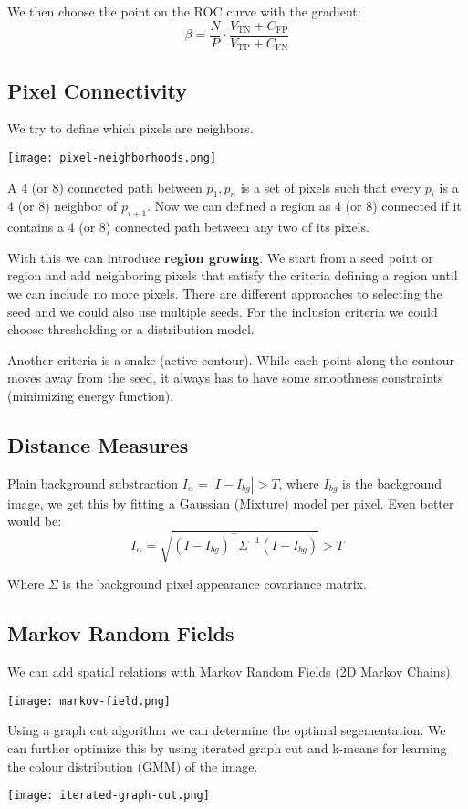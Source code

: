 We then choose the point on the ROC curve with the gradient:
$$\beta = \frac{N}{P} \cdot \frac{V_{\text{TN}} + C_{\text{FP}}}{V_{\text{TP}} + C_{\text{FN}}}$$


\subsection{Pixel Connectivity}

We try to define which pixels are neighbors.

\begin{center}
	\texttt{[image: pixel-neighborhoods.png]}
\end{center}

A 4 (or 8) connected path between $p_1, p_n$ is a set of pixels such that every $p_i$ is a 4 (or 8) neighbor of $p_{i+1}$. Now we can defined a region as 4 (or 8) connected if it contains a 4 (or 8) connected path between any two of its pixels.

With this we can introduce \textbf{region growing}. We start from a seed point or region and add neighboring pixels that satisfy the criteria defining a region until we can include no more pixels. There are different approaches to selecting the seed and we could also use multiple seeds. For the inclusion criteria we could choose thresholding or a distribution model.

Another criteria is a snake (active contour). While each point along the contour moves away from the seed, it always has to have some smoothness constraints (minimizing energy function).


\subsection{Distance Measures}

Plain background substraction $I_\alpha = |I - I_{bg}| > T$, where $I_{bg}$ is the background image, we get this by fitting a Gaussian (Mixture) model per pixel. Even better would be:
$$I_\alpha = \sqrt{(I - I_{bg})^\top \Sigma^{-1} (I - I_{bg})} > T$$

Where $\Sigma$ is the background pixel appearance covariance matrix.


\subsection{Markov Random Fields}

We can add spatial relations with Markov Random Fields (2D Markov Chains).

\begin{center}
	\texttt{[image: markov-field.png]}
\end{center}

Using a graph cut algorithm we can determine the optimal segementation. We can further optimize this by using iterated graph cut and k-means for learning the colour distribution (GMM) of the image.

\begin{center}
	\texttt{[image: iterated-graph-cut.png]}
\end{center}
